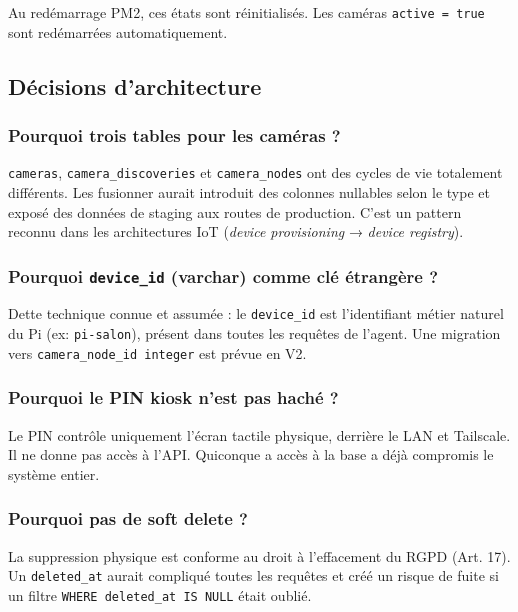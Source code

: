 \documentclass[12pt,a4paper]{article}
\begin{document}
Au redémarrage PM2, ces états sont réinitialisés. Les caméras \texttt{active = true}
sont redémarrées automatiquement.

\subsection{Décisions d'architecture}

\subsubsection{Pourquoi trois tables pour les caméras ?}

\texttt{cameras}, \texttt{camera\_discoveries} et \texttt{camera\_nodes} ont des cycles
de vie totalement différents. Les fusionner aurait introduit des colonnes nullables selon
le type et exposé des données de staging aux routes de production. C'est un pattern
reconnu dans les architectures IoT (\emph{device provisioning} → \emph{device registry}).

\subsubsection{Pourquoi \texttt{device\_id} (varchar) comme clé étrangère ?}

Dette technique connue et assumée : le \texttt{device\_id} est l'identifiant métier naturel
du Pi (ex: \texttt{pi-salon}), présent dans toutes les requêtes de l'agent.
Une migration vers \texttt{camera\_node\_id integer} est prévue en V2.

\subsubsection{Pourquoi le PIN kiosk n'est pas haché ?}

Le PIN contrôle uniquement l'écran tactile physique, derrière le LAN et Tailscale.
Il ne donne pas accès à l'API. Quiconque a accès à la base a déjà compromis le système entier.

\subsubsection{Pourquoi pas de soft delete ?}

La suppression physique est conforme au droit à l'effacement du RGPD (Art. 17).
Un \texttt{deleted\_at} aurait compliqué toutes les requêtes et créé un risque de fuite
si un filtre \texttt{WHERE deleted\_at IS NULL} était oublié.
\end{document}
